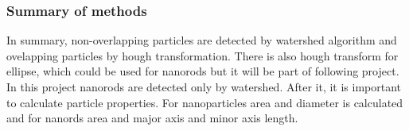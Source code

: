 \subsubsection{Summary of methods}

In summary, non-overlapping particles are detected by watershed algorithm and ovelapping
particles by hough transformation. There is also hough transform for ellipse, which could
be used for nanorods but it will be part of following project. In this project nanorods are
detected only by watershed. After it, it is important to calculate particle properties.
For nanoparticles area and diameter is calculated and for nanords area and major axis and
minor axis length.